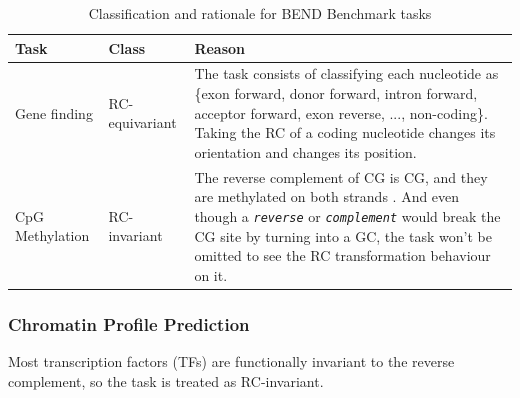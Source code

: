 \documentclass[   ]{article}
\let\oldtexttt\texttt
\renewcommand{\texttt}[1]{\oldtexttt{\itshape #1}}
\begin{document}
\begin{table}[H]
	\centering
	\caption{Classification and rationale for BEND Benchmark tasks}
	\label{tab:bend_benchmark}
	
	\begin{tabularx}{\linewidth}{p{3cm} p{3cm} X}
		\toprule
		Task & Class & Reason \\
		\midrule
		
		Gene finding & RC-equivariant & The task consists of classifying each nucleotide as \{exon forward, donor forward, intron forward, acceptor forward, exon reverse, ..., non-coding\}. Taking the RC of a coding nucleotide changes its orientation and changes its position. \\
		
		\midrule
		
		CpG Methylation & RC-invariant & The reverse complement of CG is CG, and they are methylated on both strands \cite{birdUseRestrictionEnzymes1978}. And even though a \texttt{reverse} or \texttt{complement} would break the CG site by turning into a GC, the task won't be omitted to see the RC transformation behaviour on it.\\
		
		\bottomrule
	\end{tabularx}
\end{table}

\subsubsection{Chromatin Profile Prediction}

Most transcription factors (TFs) are functionally invariant to the reverse complement\citep{coonsDecodingInversionSymmetry2019}, so the task
is treated as RC-invariant. 
\end{document}

